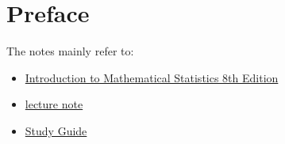 \chapter*{Preface}

The notes mainly refer to:
\begin{itemize}
    \item \href{}{Introduction to Mathematical Statistics 8th Edition}
    \item \href{https://faculty.etsu.edu/gardnerr/4047/notes-Hogg-McKean-Craig.htm}{lecture note}
    \item \href{https://faculty.etsu.edu/gardnerr/4047/notes-Hogg-McKean-Craig/StudyGuide1.pdf}{Study Guide}
\end{itemize}

